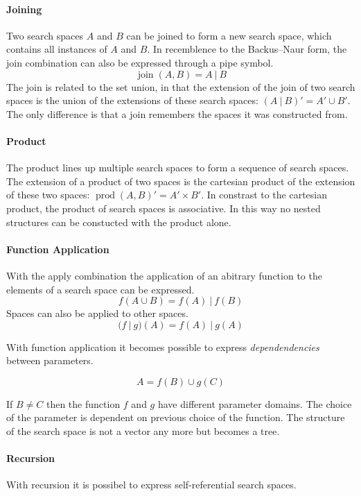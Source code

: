 \documentclass[english]{article}
\begin{document}
\paragraph{Joining}
Two search spaces $A$ and $B$ can be joined to form a new search space, which contains all instances of $A$ and $B$. In recemblence to the Backus–Naur form, the join combination can also be expressed through a pipe symbol.
$$ \operatorname{join}(A, B) = A\ |\ B $$
The join is related to the set union, in that the extension of the join of two search spaces is the union of the extensions of these search spaces: $(A\ |\ B)' = A' \cup B'$. The only difference is that a join remembers the spaces it was constructed from.

\paragraph{Product}
The product lines up multiple search spaces to form a sequence of search spaces. The extension of a product of two spaces is the cartesian product of the extension of these two spaces: $\operatorname{prod}(A,B)' = A' \times B'$. In constrast to the cartesian product, the product of search spaces is associative.  In this way no nested structures can be constucted with the product alone.

\paragraph{Function Application}
With the apply combination the application of an abitrary function to the elements of a search space can be expressed.
$$ f(A \cup B) = f(A)\ |\ f(B) $$
Spaces can also be applied to other spaces.
$$(f\ |\ g)(A) = f(A)\ |\ g(A)$$

With function application it becomes possible to express \textit{dependendencies} between parameters.

$$A = f(B) \cup g(C)$$

If $B \neq C$ then the function $f$ and $g$ have different parameter domains. The choice of the parameter is dependent on previous choice of the function.  The structure of the search space is not a vector any more but becomes a tree.



\paragraph{Recursion}
With recursion it is possibel to express self-referential search spaces.
\end{document}
